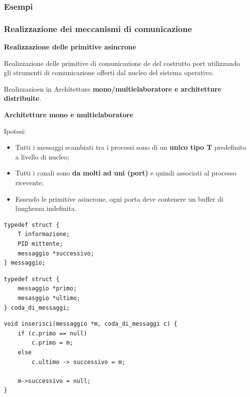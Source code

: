 \documentclass{article}
\begin{document}
\subsubsection{Esempi}


\subsubsection{Realizzazione dei meccanismi di comunicazione}

{\large \textbf{Realizzazione delle primitive asincrone}}

\vspace{3mm}
Realizzazione delle primitive di comunicazione de del costrutto port utilizzando gli strumenti di comunicazione offerti dal nucleo del sistema operativo.

Realizzazioen in Architetture \textbf{mono/multielaboratore e architetture distribuite}.

\vspace{5mm}
\textbf{Architetture mono e multielaboratore}

Ipotesi:
\begin{itemize}
    \item Tutti i messaggi scambiati tra i processi sono di un \textbf{unico tipo T} predefinito a livello di nucleo;
    \item Tutti i canali sono \textbf{da molti ad uni (port)} e quindi associati al processo ricevente;
    \item Essendo le primitive asincrone, ogni porta deve contenere un buffer di lunghezza indefinita.
\end{itemize}

\noindent
\begin{minipage}{.45\columnwidth}
\begin{lstlisting}
typedef struct {
    T informazione;
    PID mittente;
    messaggio *successivo;
} messaggio;
\end{lstlisting}
\end{minipage}\hfill
\begin{minipage}{.45\columnwidth}
\begin{lstlisting}
typedef struct {
    messaggio *primo;
    mesasggio *ultimo;
} coda_di_messaggi;
\end{lstlisting}
\end{minipage}

\begin{lstlisting}
void inserisci(messaggio *m, coda_di_messaggi c) {
    if (c.primo == null)
        c.primo = m;
    else
        c.ultimo -> successivo = m;
    
    m->successivo = null;
}
\end{lstlisting}
\end{document}

